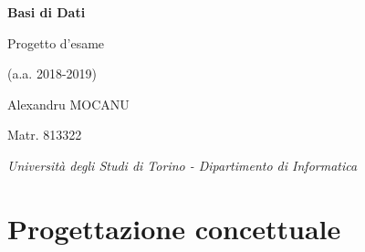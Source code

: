 \documentclass[12pt]{extarticle}
\begin{document}
\begin{titlepage}
\centering
{\LARGE\bfseries Basi di Dati}

\vspace{1cm}

{\Large Progetto d'esame}

\vspace{0.2cm}
{\large (a.a. 2018-2019)}

\vspace{2cm}

{\large Alexandru MOCANU}

\vspace{0.2cm}

{\small Matr. 813322}


\vspace{2cm}


\vfill

{\itshape Università degli Studi di Torino - Dipartimento di Informatica}
\end{titlepage}

\tableofcontents

\clearpage

\section{Progettazione concettuale}
\end{document}

